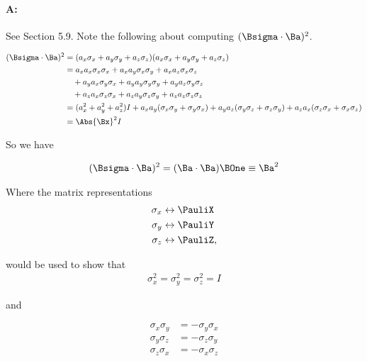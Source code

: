 \paragraph{A:} See Section 5.9.  Note the following about computing \((\Bsigma \cdot \Ba)^2\).

\begin{equation}\label{eqn:lecture8makingSenseOfQM:1160}
\begin{aligned}
(\Bsigma \cdot \Ba)^2
&=
(a_x \sigma_x
+ a_y \sigma_y
+ a_z \sigma_z)
(a_x \sigma_x
+ a_y \sigma_y
+ a_z \sigma_z) \\
&=
a_x a_x \sigma_x \sigma_x
+a_x a_y \sigma_x \sigma_y
+a_x a_z \sigma_x \sigma_z \\
&\quad+a_y a_x \sigma_y \sigma_x
+a_y a_y \sigma_y \sigma_y
+a_y a_z \sigma_y \sigma_z \\
&\quad+a_z a_x \sigma_z \sigma_x
+a_z a_y \sigma_z \sigma_y
+a_z a_z \sigma_z \sigma_z \\
&= (a_x^2 + a_y^2 + a_z^2) I
+ a_x a_y ( \sigma_x \sigma_y + \sigma_y \sigma_x)
+ a_y a_z ( \sigma_y \sigma_z + \sigma_z \sigma_y)
+ a_z a_x ( \sigma_z \sigma_x + \sigma_x \sigma_z) \\
&= \Abs{\Bx}^2 I
\end{aligned}
\end{equation}

So we have

\begin{equation}\label{eqn:PHY356HNov2:135}
\begin{aligned}
(\Bsigma \cdot \Ba)^2 = (\Ba \cdot \Ba) \BOne \equiv \Ba^2
\end{aligned}
\end{equation}

Where the matrix representations
\begin{equation}\label{eqn:PHY356HNov2:140}
\begin{aligned}
\sigma_x &\leftrightarrow \PauliX \\
\sigma_y &\leftrightarrow \PauliY \\
\sigma_z &\leftrightarrow \PauliZ,
\end{aligned}
\end{equation}

would be used to show that
\begin{equation}\label{eqn:PHY356HNov2:150}
\begin{aligned}
\sigma_x^2 = \sigma_y^2 = \sigma_z^2 = I
\end{aligned}
\end{equation}

and

\begin{equation}\label{eqn:PHY356HNov2:155}
\begin{aligned}
\sigma_x \sigma_y &= -\sigma_y \sigma_x \\
\sigma_y \sigma_z &= -\sigma_z \sigma_y \\
\sigma_z \sigma_x &= -\sigma_x \sigma_z
\end{aligned}
\end{equation}

